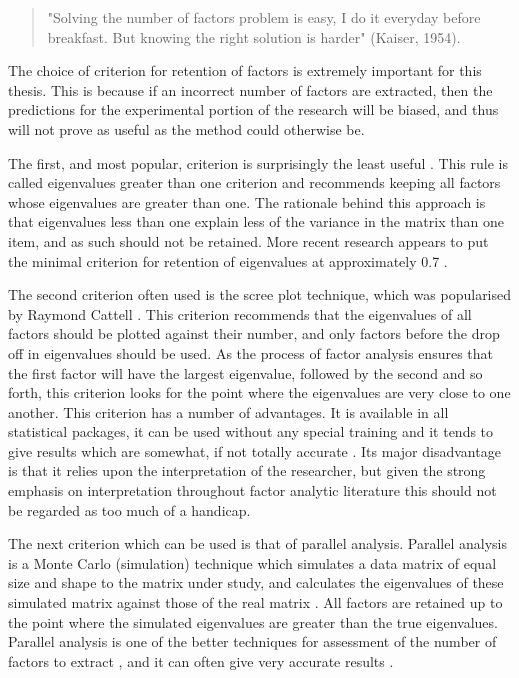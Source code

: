 \begin{quotation}
  "Solving the number of factors problem is
     easy, I do it everyday before breakfast.  But knowing the right
     solution is harder" (Kaiser, 1954).
\end{quotation}

The choice of criterion for retention of factors is extremely important for this thesis. This is because if an incorrect number of factors are extracted, then the predictions for the experimental portion of the research will be biased, and thus will not prove as useful as the method could otherwise be. 

The first, and most popular, criterion is surprisingly the least useful \cite{zwick1986comparison}. This rule is called eigenvalues greater than one criterion and recommends keeping all factors whose eigenvalues are greater than one. The rationale behind this approach is that eigenvalues less than one explain less of the variance in the matrix than one item, and as such should not be retained.  More recent research appears to put the minimal criterion for retention of eigenvalues at approximately 0.7 \cite{henson2006use}. 

The second criterion often used is the scree plot technique, which was popularised by Raymond Cattell . This criterion recommends that the eigenvalues of all factors should be plotted against their number, and only factors before the drop off in eigenvalues should be used. As the process of factor analysis ensures that the first factor will have the largest eigenvalue, followed by the second and so forth, this criterion looks for the point where the eigenvalues are very close to one another.  This criterion has a number of advantages.  It is available in all statistical packages, it can be used without any special training and it tends to give results which are somewhat, if not totally accurate \cite{zwick1986comparison}.  Its major disadvantage is that it relies upon the interpretation of the researcher, but given the strong emphasis on interpretation throughout factor analytic literature this should not be regarded as too much of a handicap.

The next criterion which can be used is that of parallel analysis. Parallel analysis is a Monte Carlo (simulation)  technique which simulates a data matrix of equal size and shape to the matrix under study, and calculates the eigenvalues of these simulated matrix against those of the real matrix \cite{horn1965rationale}. All factors are retained up to the point where the simulated eigenvalues are greater than the true eigenvalues.  Parallel analysis is one of the better techniques for assessment of the number of factors to extract , and it can often give very accurate results \cite{zwick1986comparison}.

